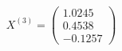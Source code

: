 \documentclass[preview]{standalone}
\begin{document}
\begin{align*}
X^{(3)} = \begin{pmatrix} 1.0245 \\ 0.4538 \\ -0.1257 \end{pmatrix}
\end{align*}
\end{document}
